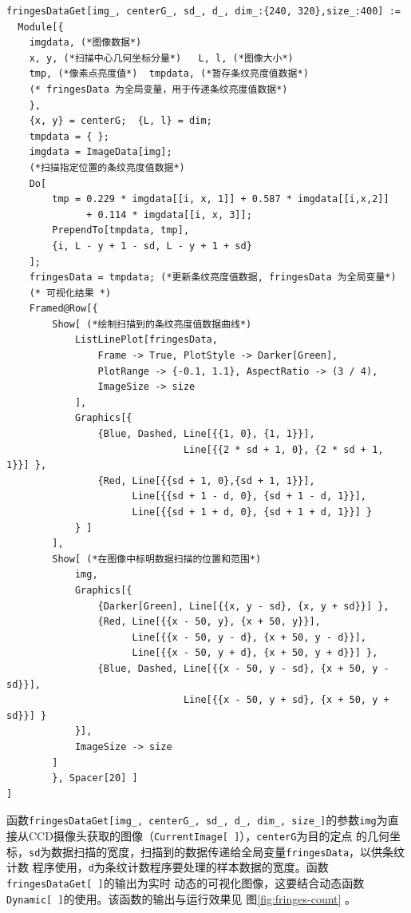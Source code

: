\documentclass[UTF8,a4paper,12pt]{article}
\begin{document}
\begin{verbatim}
fringesDataGet[img_, centerG_, sd_, d_, dim_:{240, 320},size_:400] := 
  Module[{
    imgdata, (*图像数据*)
    x, y, (*扫描中心几何坐标分量*)   L, l, (*图像大小*)
    tmp, (*像素点亮度值*)  tmpdata, (*暂存条纹亮度值数据*)
    (* fringesData 为全局变量，用于传递条纹亮度值数据*)
    },
    {x, y} = centerG;  {L, l} = dim;
    tmpdata = { };
    imgdata = ImageData[img];
    (*扫描指定位置的条纹亮度值数据*)
    Do[
        tmp = 0.229 * imgdata[[i, x, 1]] + 0.587 * imgdata[[i,x,2]] 
              + 0.114 * imgdata[[i, x, 3]];
        PrependTo[tmpdata, tmp],
        {i, L - y + 1 - sd, L - y + 1 + sd}
    ];
    fringesData = tmpdata; (*更新条纹亮度值数据, fringesData 为全局变量*)
    (* 可视化结果 *)
    Framed@Row[{
        Show[ (*绘制扫描到的条纹亮度值数据曲线*)
            ListLinePlot[fringesData,
                Frame -> True, PlotStyle -> Darker[Green], 
                PlotRange -> {-0.1, 1.1}, AspectRatio -> (3 / 4),
                ImageSize -> size
            ],
            Graphics[{
                {Blue, Dashed, Line[{{1, 0}, {1, 1}}], 
                               Line[{{2 * sd + 1, 0}, {2 * sd + 1, 1}}] },
                {Red, Line[{{sd + 1, 0},{sd + 1, 1}}], 
                      Line[{{sd + 1 - d, 0}, {sd + 1 - d, 1}}],
                      Line[{{sd + 1 + d, 0}, {sd + 1 + d, 1}}] }
            } ]
        ],
        Show[ (*在图像中标明数据扫描的位置和范围*)
            img,
            Graphics[{
                {Darker[Green], Line[{{x, y - sd}, {x, y + sd}}] },
                {Red, Line[{{x - 50, y}, {x + 50, y}}],
                      Line[{{x - 50, y - d}, {x + 50, y - d}}],
                      Line[{{x - 50, y + d}, {x + 50, y + d}}] },
                {Blue, Dashed, Line[{{x - 50, y - sd}, {x + 50, y - sd}}],
                               Line[{{x - 50, y + sd}, {x + 50, y + sd}}] }
            }], 
            ImageSize -> size
        ] 
        }, Spacer[20] ]
]
\end{verbatim}

函数\verb|fringesDataGet[img_, centerG_, sd_, d_, dim_, size_]|的参数\verb|img|为直\\
接从CCD摄像头获取的图像（\verb|CurrentImage[ ]|），\verb|centerG|为目的定点
的几何坐标，\verb|sd|为数据扫描的宽度，扫描到的数据传递给全局变量\verb|fringesData|，以供条纹计数
程序使用，\verb|d|为条纹计数程序要处理的样本数据的宽度。函数\verb|fringesDataGet[ ]|的输出为实时
动态的可视化图像，这要结合动态函数\verb|Dynamic[ ]|的使用。该函数的输出与运行效果见
图\;\ref{fig:fringes-count} 。
\end{document}
